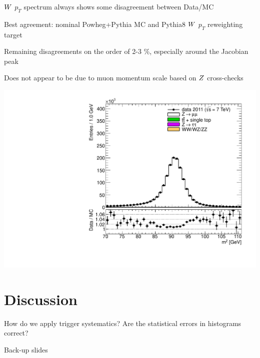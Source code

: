 {
\iteb
\item $W$ $p_{T}$ spectrum always shows some disagreement between Data/MC
\item Best agreement: nominal Powheg+Pythia MC and Pythia8 $W$ $p_{T}$ reweighting target
\item Remaining disagreements on the order of 2-3 \%, especially around the Jacobian peak
\item Does not appear to be due to muon momentum scale based on $Z$ cross-checks
\itee
}

{
\includegraphics[height=0.9\textheight]{dates/20121119/figures/zplots/zm_nomatch.pdf}
}

\section{ Discussion }
{
  \iteb
  \item How do we apply trigger systematics? Are the statistical errors in histograms correct?
  \itee
}

\appendix
{}
\setcounter{finalframe}{\value{framenumber}}

\slide{}
{

\centering
\Huge Back-up slides
}
